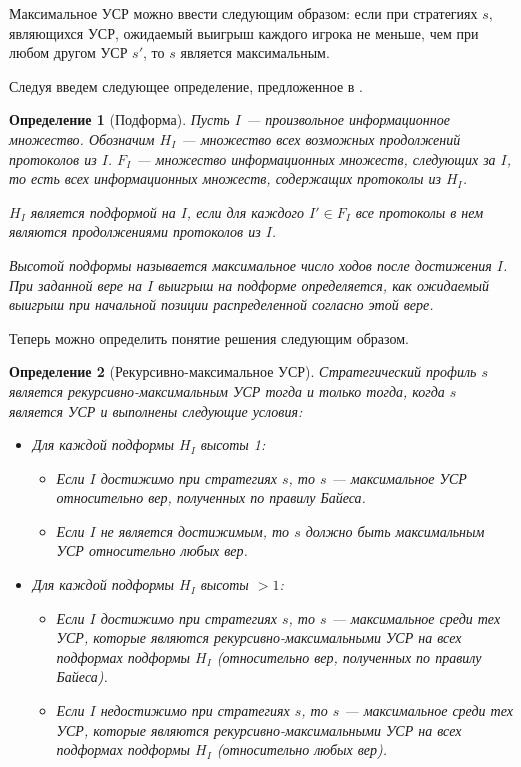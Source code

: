 \documentclass[14pt, a4paper, russian]{report}
\newtheorem{definition}{\indent Определение}
\begin{document}
        Максимальное УСР можно ввести следующим образом: если при стратегиях $s$, являющихся УСР, ожидаемый выигрыш каждого игрока не меньше, чем при любом другом УСР $s'$, то $s$ является максимальным.

        Следуя \cite{chen2017noncoop} введем следующее определение, предложенное в \cite{kreps1982sequential}.
        \begin{definition}[Подформа]
            Пусть $I$ --- произвольное информационное множество. Обозначим $H_I$ --- множество всех возможных продолжений протоколов из $I$. $F_I$ --- множество информационных множеств, следующих за $I$, то есть всех информационных множеств, содержащих протоколы из $H_I$.

            $H_I$ является подформой на $I$, если для каждого $I' \in F_I$ все протоколы в нем являются продолжениями протоколов из $I$.

            Высотой подформы называется максимальное число ходов после достижения $I$. При заданной вере на $I$ выигрыш на подформе определяется, как ожидаемый выигрыш при начальной позиции распределенной согласно этой вере.
        \end{definition}

        Теперь можно определить понятие решения следующим образом.

        \begin{definition}[Рекурсивно-максимальное УСР]
            Стратегический профиль $s$ является рекурсивно-максимальным УСР тогда и только тогда, когда $s$ является УСР и выполнены следующие условия:
            \begin{itemize}
                \item Для каждой подформы $H_I$ высоты 1:
                    \begin{itemize}
                        \item Если $I$ достижимо при стратегиях $s$, то $s$ --- максимальное УСР относительно вер, полученных по правилу Байеса.
                        \item Если $I$ не является достижимым, то $s$ должно быть максимальным УСР относительно любых вер.
                    \end{itemize}
                \item Для каждой подформы $H_I$ высоты $>1$:
                    \begin{itemize}
                        \item Если $I$ достижимо при стратегиях $s$, то $s$ --- максимальное среди тех УСР, которые являются рекурсивно-максимальными УСР на всех подформах подформы $H_I$ (относительно вер, полученных по правилу Байеса).
                        \item Если $I$ недостижимо при стратегиях $s$, то $s$ --- максимальное среди тех УСР, которые являются рекурсивно-максимальными УСР на всех подформах подформы $H_I$ (относительно любых вер).
                    \end{itemize}
            \end{itemize}
        \end{definition}
\end{document}

